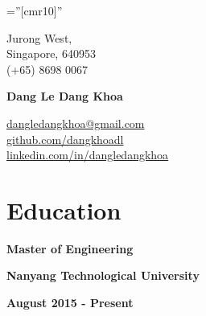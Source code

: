 \documentclass[10pt]{article}
\begin{document}
    \pagestyle{empty}       %
    \font\fb=''[cmr10]''    %

    \setlength{\columnsep}{1.0cm}
    \begin{multicols}{3}
        \begin{flushleft}
            \textsc Jurong West, \\
            \textsc Singapore, 640953 \\
            \textsc (+65) 8698 0067
        \end{flushleft}

        \columnbreak

        \begin{center}
            \textbf{{\huge Dang Le Dang Khoa }}
        \end{center}

        \columnbreak

        \begin{flushright}
            \href{mailto:dangledangkhoa@gmail.com}{dangledangkhoa@gmail.com} \\
            \href{https://github.com/dangkhoadl}{github.com/dangkhoadl} \\
            \href{https://sg.linkedin.com/in/dangledangkhoa}{linkedin.com/in/dangledangkhoa}
        \end{flushright}
    \end{multicols}

    \vspace{-5mm}

    \section{Education}

        \vspace{-5mm}

        \begin{multicols}{3}
            \begin{flushleft}
                \textbf{Master of Engineering}
            \end{flushleft}

            \columnbreak

            \begin{center}
                \textbf{Nanyang Technological University}
            \end{center}

            \columnbreak

            \begin{flushright}
                \textbf{August 2015 - Present}
            \end{flushright}
        \end{multicols}
\end{document}
